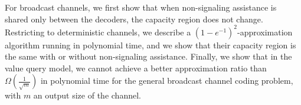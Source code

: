 For broadcast channels, we first show that when non-signaling assistance is shared only between the decoders, the capacity region does not change. Restricting to deterministic channels, we describe a $(1-e^{-1})^2$-approximation algorithm running in polynomial time, and we show that their capacity region is the same with or without non-signaling assistance. Finally, we show that in the value query model, we cannot achieve a better approximation ratio than $\Omega\left(\frac{1}{\sqrt{m}}\right)$ in polynomial time for the general broadcast channel coding problem, with $m$ an output size of the channel.

